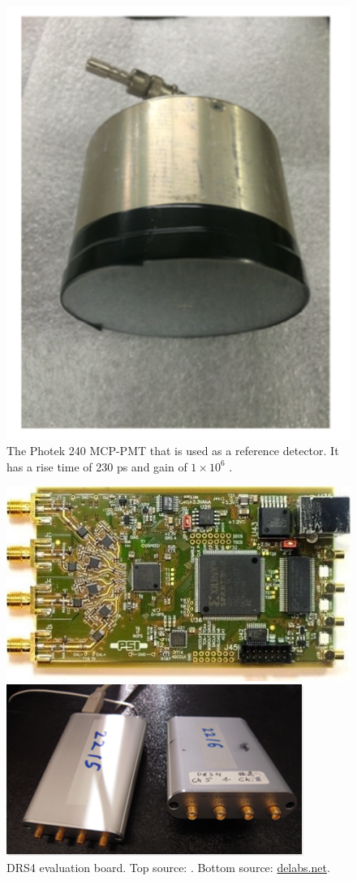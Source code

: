 \documentclass[twocolumn,aps,prd,reprint,superscriptaddress,floatfix]{revtex4-1}
\begin{document}
\begin{figure}[!htbp]
	\centering
    \includegraphics[angle=90,width=.75\linewidth]{photek}
    \caption{The Photek 240 MCP-PMT that is used as a reference detector. It has a rise time of 230 ps and gain of $1\times 10^6$ \cite{Gillian_ppt}.}
    \label{fig:photek}
\end{figure}

\begin{figure}[!htb]
	\centering
	\includegraphics[width=0.9\linewidth]{DRS4_-_Delabs.jpg}
    
    \includegraphics[width=0.9\linewidth]{DRS4}
    \caption{DRS4 evaluation board. Top source: \cite{Si_ppt}. Bottom source: \href{http://www.delabs.net/drs4-evaluation-board-paul-scherrer-institut/}{delabs.net}.}
    \label{DRS4}
\end{figure}
\end{document}
